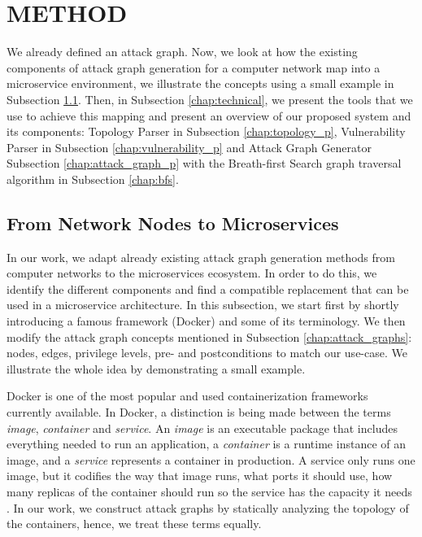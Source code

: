 \section{METHOD}
\label{chap:method}
We already defined an attack graph. Now, we look at how the existing components of attack graph generation for a computer network map into a microservice environment, we illustrate the concepts using a small example in Subsection \ref{chap:mapping}. Then, in Subsection \ref{chap:technical}, we present the tools that we use to achieve this mapping and present an overview of our proposed system and its components: Topology Parser in Subsection \ref{chap:topology_p}, Vulnerability Parser in Subsection \ref{chap:vulnerability_p} and Attack Graph Generator Subsection \ref{chap:attack_graph_p} with the Breath-first Search graph traversal algorithm in Subsection \ref{chap:bfs}. 


\subsection{From Network Nodes to Microservices}
\label{chap:mapping}
In our work, we adapt already existing attack graph generation methods from computer networks to the microservices ecosystem. In order to do this, we identify the different components and find a compatible replacement that can be used in a microservice architecture. In this subsection, we start first by shortly introducing a famous framework (Docker) and some of its terminology. We then modify the attack graph concepts mentioned in Subsection \ref{chap:attack_graphs}: nodes, edges, privilege levels, pre- and postconditions to match our use-case. We illustrate the whole idea  by demonstrating a small example.

Docker is one of the most popular and used containerization frameworks currently available. In Docker, a distinction is being made between the terms \textit{image}, \textit{container} and \textit{service}. An \textit{image} is an executable package that includes everything needed to run an application, a \textit{container} is a runtime instance of an image, and a \textit{service} represents a container in production. A service only runs one image, but it codifies the way that image runs, what ports it should use, how many replicas of the container should run so the service has the capacity it needs \cite{merkel2014docker}. In our work, we construct attack graphs by statically analyzing the topology of the containers, hence, we treat these terms equally.  

